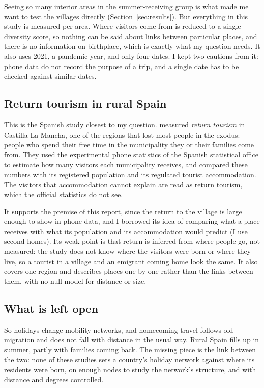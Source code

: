 Seeing so many interior areas in the summer-receiving group is what made me want to test the villages directly (Section~\ref{sec:results}). But everything in this study is measured per area. Where visitors come from is reduced to a single diversity score, so nothing can be said about links between particular places, and there is no information on birthplace, which is exactly what my question needs. It also uses 2021, a pandemic year, and only four dates. I kept two cautions from it: phone data do not record the purpose of a trip, and a single date has to be checked against similar dates.

\subsection{Return tourism in rural Spain}

This is the Spanish study closest to my question. \citet{garciagonzalez2024retorno} measured \emph{return tourism} in Castilla-La Mancha, one of the regions that lost most people in the exodus: people who spend their free time in the municipality they or their families come from. They used the experimental phone statistics of the Spanish statistical office to estimate how many visitors each municipality receives, and compared these numbers with its registered population and its regulated tourist accommodation. The visitors that accommodation cannot explain are read as return tourism, which the official statistics do not see.

It supports the premise of this report, since the return to the village is large enough to show in phone data, and I borrowed its idea of comparing what a place receives with what its population and its accommodation would predict (I use second homes). Its weak point is that return is inferred from where people go, not measured: the study does not know where the visitors were born or where they live, so a tourist in a village and an emigrant coming home look the same. It also covers one region and describes places one by one rather than the links between them, with no null model for distance or size.

\subsection{What is left open}

So holidays change mobility networks, and homecoming travel follows old migration and does not fall with distance in the usual way. Rural Spain fills up in summer, partly with families coming back. The missing piece is the link between the two: none of these studies sets a country's holiday network against where its residents were born, on enough nodes to study the network's structure, and with distance and degrees controlled.
